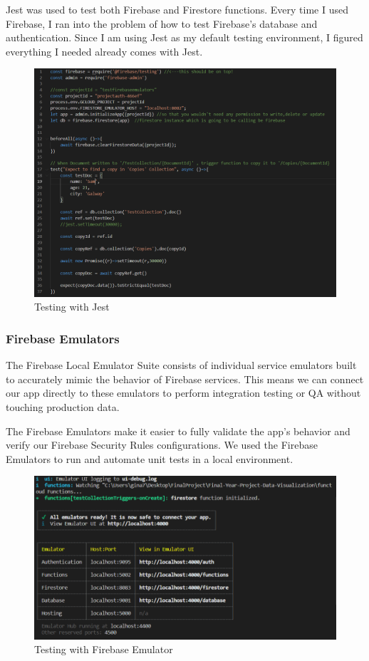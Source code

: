 \vspace{5mm}

Jest was used to test both Firebase and Firestore functions.
Every time I used Firebase, I ran into the problem of how to test Firebase's database and authentication. Since I am using Jest as my default testing environment, I figured everything I needed already comes with Jest.

\begin{figure}[ht]
    \centering
    \includegraphics[scale=0.6]{img/jest.PNG}
    \caption{Testing with Jest}
    \label{fig:my_label4}
\end{figure}

\subsubsection{Firebase Emulators}
The Firebase Local Emulator Suite consists of individual service emulators built to accurately mimic the behavior of Firebase services. This means we can connect our app directly to these emulators to perform integration testing or QA without touching production data.\cite{fbemulator}

The Firebase Emulators make it easier to fully validate the app's behavior and verify our Firebase Security Rules configurations.
We used the Firebase Emulators to run and automate unit tests in a local environment. 

\begin{figure}[ht]
    \centering
    \includegraphics[scale=0.7]{img/FirebaseEmulator.PNG}
    \caption{Testing with Firebase Emulator}
    \label{fig:my_label4}
\end{figure}


